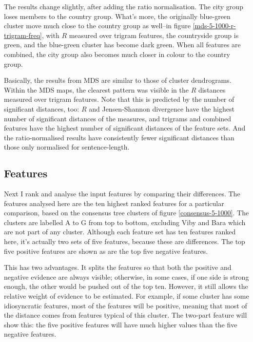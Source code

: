 The results change slightly, after adding the ratio normalisation. The
city group loses members to the country group. What's more, the
originally blue-green cluster move much close to the country group
as well--in figure \ref{mds-5-1000-r-trigram-freq}, with
$R$ measured over trigram features, the countryside group is green,
and the blue-green cluster has become dark green. When all features
are combined, the city group also becomes much closer in colour to the
country group.

Basically, the results from MDS are similar to those of cluster
dendrograms. Within the MDS maps, the clearest pattern was visible in
the $R$ distances measured over trigram features. Note that this is
predicted by the number of significant distances, too: $R$ and
Jensen-Shannon divergence have the highest number of significant
distances of the measures, and trigrams and combined features have the
highest number of significant distances of the feature sets. And the
ratio-normalised results have consistently fewer significant distances
than those only normalised for sentence-length.

\subsection{Features}


Next I rank and analyse the input features by comparing their
differences. The features analysed here are the
ten highest ranked features for a particular comparison, based on the
consensus tree clusters of figure \ref{consensus-5-1000}. The clusters
are labelled A to G from top to bottom, excluding Viby and Bara which
are not part of any cluster. Although each feature set has ten
features ranked here, it's actually two sets of five features, because
these are differences. The top five positive features are shown as are
the top five negative features.

This has two advantages. It splits the features so that both the
positive and negative evidence are always visible; otherwise, in some
cases, if one side is strong enough, the other would be pushed out of
the top ten. However, it still allows the relative weight of evidence
to be estimated. For example, if some cluster has some idiosyncratic
features, most of the features will be positive, meaning that most of
the distance comes from features typical of this cluster. The two-part
feature will show this: the five positive features will have much
higher values than the five negative features.

